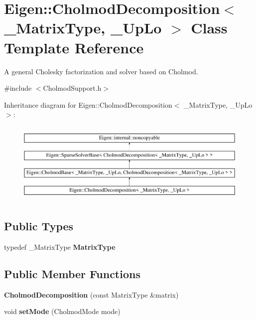 \hypertarget{class_eigen_1_1_cholmod_decomposition}{}\section{Eigen\+::Cholmod\+Decomposition$<$ \+\_\+\+Matrix\+Type, \+\_\+\+Up\+Lo $>$ Class Template Reference}
\label{class_eigen_1_1_cholmod_decomposition}


A general Cholesky factorization and solver based on Cholmod.  




{\ttfamily \#include $<$Cholmod\+Support.\+h$>$}

Inheritance diagram for Eigen\+::Cholmod\+Decomposition$<$ \+\_\+\+Matrix\+Type, \+\_\+\+Up\+Lo $>$\+:\begin{figure}[H]
\begin{center}
\leavevmode
\includegraphics[height=4.000000cm]{class_eigen_1_1_cholmod_decomposition}
\end{center}
\end{figure}
\subsection*{Public Types}
\begin{DoxyCompactItemize}
\item 
\mbox{\label{class_eigen_1_1_cholmod_decomposition_aea53309ad25a4d695c6884ca4016ab89}} 
typedef \+\_\+\+Matrix\+Type {\bfseries Matrix\+Type}
\end{DoxyCompactItemize}
\subsection*{Public Member Functions}
\begin{DoxyCompactItemize}
\item 
\mbox{\label{class_eigen_1_1_cholmod_decomposition_aa89a5c32285a145485f143caa234cd9d}} 
{\bfseries Cholmod\+Decomposition} (const Matrix\+Type \&matrix)
\item 
\mbox{\label{class_eigen_1_1_cholmod_decomposition_afa7d632441f66874d4097276d5e23df5}} 
void {\bfseries set\+Mode} (Cholmod\+Mode mode)
\end{DoxyCompactItemize}
